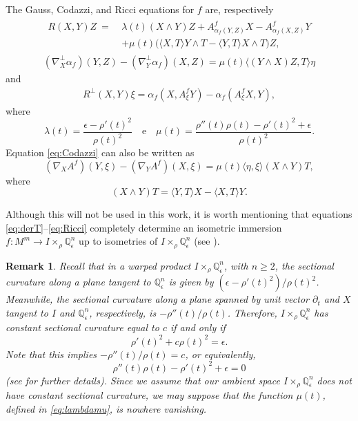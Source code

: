 \documentclass[11pt,a4paper]{article}
\newtheorem{rem}[defi]{Remark}
\numberwithin{equation}{section}
\newcommand{\Q}{\mathbb{Q}}
\newcommand{\e}{\epsilon}
\newcommand{\pie}{\langle}
\newcommand{\pid}{\rangle}
\newcommand{\IWP}{I\times_{\rho}\Q^n_{\epsilon}}
\newcommand{\co}{\colon}
\newcommand{\dt}{\partial_t}
\newcommand{\np}{\nabla^\perp}
\newcommand{\pl}{\langle}
\newcommand{\pr}{\rangle}
\begin{document}
The Gauss, Codazzi, and Ricci equations for $f$ are, respectively
\begin{eqnarray} \label{eq:Gauss}
\begin{aligned}
R(X,Y)Z \ = \ & \lambda(t)(X\wedge Y)Z + A^f_{\alpha_f(Y,Z)}X-A^f_{\alpha_f(X,Z)}Y \\
& + \mu(t)\big(\pie X,T\pid Y\wedge T - \pie Y,T\pid X\wedge T\big)Z,
\end{aligned}
\end{eqnarray}
\begin{eqnarray} \label{eq:Codazzi}
(\np_X\alpha_f)(Y,Z) - (\np_Y\alpha_f)(X,Z) = \mu(t)
\pie(Y\wedge X)Z,T\pid\eta
\end{eqnarray}
and
\begin{eqnarray} \label{eq:Ricci}
R^\perp(X,Y)\xi = \alpha_f(X,A^f_\xi Y)-\alpha_f(A^f_\xi X,Y),
\end{eqnarray}
where
\begin{equation} \label{eq:lambdamu}
\lambda(t) = \frac{\e-\rho'(t)^2}{\rho(t)^2}
\quad\text{e}\quad
\mu(t) = \frac{\rho''(t)\rho(t)-\rho'(t)^2+\e}{\rho(t)^2}.
\end{equation}
Equation \eqref{eq:Codazzi} can also be written as
\begin{equation} \label{eq:Codazzi2}
(\nabla_XA^f)(Y,\xi) - (\nabla_YA^f)(X,\xi) = \mu(t)\pl\eta,\xi\pr(X\wedge Y)T,
\end{equation}
where
\[
(X\wedge Y)T = \pl Y,T\pr X-\pl X,T\pr Y.
\]

Although this will not be used in this work, it is worth mentioning that equations \eqref{eq:derT}--\eqref{eq:Ricci} completely determine an isometric immersion $f\co M^m\to\IWP$ up to isometries of $\IWP$ (see \cite[Theorem 5.1]{FiVi}).

\begin{rem}
Recall that in a warped product $\IWP$, with $n\geq2$, the sectional curvature along a plane tangent to $\Q^n_\e$ is given by $(\e-\rho'(t)^2)/\rho(t)^2$. Meanwhile, the sectional curvature along a plane spanned by unit vector $\dt$ and $X$ tangent to $I$ and $\Q^n_\e$, respectively, is $-\rho''(t)/\rho(t)$. Therefore, $\IWP$ has constant sectional curvature equal to $c$ if and only if
\[
\rho'(t)^2+c\rho(t)^2=\e.
\]
Note that this implies $-\rho''(t)/\rho(t)=c$, or equivalently,
\[
\rho''(t)\rho(t)-\rho'(t)^2+\e=0
\]
(see \cite[Proposition 4.6]{MaTo} for further details). Since we assume that our ambient space $\IWP$ does not have constant sectional curvature, we may suppose that the function $\mu(t)$, defined in \eqref{eq:lambdamu}, is nowhere vanishing. 
\end{rem}
\end{document}
